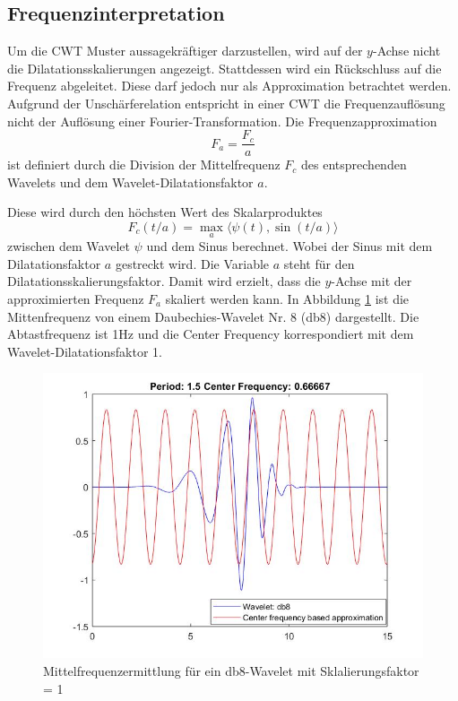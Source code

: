 \begin{refsection}
\subsection{Frequenzinterpretation}
Um die CWT Muster aussagekräftiger darzustellen, wird auf der $y$-Achse nicht die Dilatationsskalierungen angezeigt. 
Stattdessen wird ein Rückschluss auf die Frequenz abgeleitet. 
Diese darf jedoch nur als Approximation betrachtet werden.
Aufgrund der Unschärferelation entspricht in einer CWT die Frequenzauflösung nicht der Auflösung einer Fourier-Transformation. 
Die Frequenzapproximation 
\begin{equation}
F_a=\dfrac{F_c}{a}
\end{equation}
ist definiert durch die Division der Mittelfrequenz $F_c$ des entsprechenden Wavelets und dem Wavelet-Dilatationsfaktor $a$.

Diese wird durch den höchsten Wert des Skalarproduktes 
\begin{equation}
F_c(t/a) = \max_a\langle \psi(t),\sin (t/a)\rangle
\end{equation}
zwischen dem Wavelet $\psi$ und dem Sinus berechnet.
Wobei der Sinus mit dem Dilatationsfaktor $a$ gestreckt wird.
Die Variable $a$ steht für den Dilatationsskalierungsfaktor. 
Damit wird erzielt, dass die $y$-Achse mit der approximierten Frequenz $F_a$ skaliert werden kann.
In Abbildung \ref{fig:Mittenfrequ} ist die Mittenfrequenz von einem Daubechies-Wavelet Nr. 8 (db8) dargestellt.
Die Abtastfrequenz ist 1Hz und die Center Frequency korrespondiert mit dem Wavelet-Dilatationsfaktor 1.   

\begin{figure}
	\centering
	\includegraphics [width=0.7\linewidth] {papers/gis/Bilder/Mittenfrequenz}
	\caption{Mittelfrequenzermittlung für ein db8-Wavelet mit Sklalierungsfaktor = 1}
	\label{fig:Mittenfrequ}
\end{figure}



\end{refsection}
